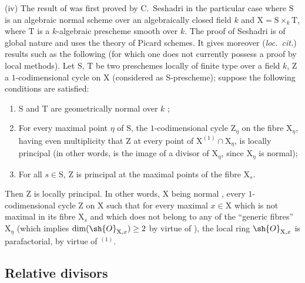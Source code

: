 \begin{env}[21.14.4bis]
\label{IV.21.14.4bis}
(iv) The result of  was first proved by C.~Seshadri \cite{IV-44} in the particular case where $\mathrm{S}$ is an algebraic normal scheme over an algebraically closed field $k$ and $\mathrm{X}=\mathrm{S}\times_k\mathrm{T}$, where $\mathrm{T}$ is a $k$-algebraic prescheme smooth over $k$.
The proof of Seshadri \cite[pp.~188--189]{IV-44} is of global nature and uses the theory of Picard schemes.
It gives moreover (\emph{loc.\ cit.}) results such as the following (for which one does not currently possess a proof by local methods).
Let $\mathrm{S}$, $\mathrm{T}$ be two preschemes locally of finite type over a field $k$, $\mathrm{Z}$ a $1$-codimensional cycle on $\mathrm{X}$ (considered as S-prescheme); suppose the following conditions are satisfied:
\begin{enumerate}[label=\arabic*\textsuperscript{o}]
  \item $\mathrm{S}$ and $\mathrm{T}$ are geometrically normal over $k$ ;
  \item For every maximal point $\eta$ of $\mathrm{S}$, the $1$-codimensional cycle $\mathrm{Z}_\eta$ on the fibre $\mathrm{X}_\eta$, having even multiplicity that $\mathrm{Z}$ at every point of $\mathrm{X}^{(1)}\cap\mathrm{X}_\eta$, is locally principal (in other words, is the image of a divisor of $\mathrm{X}_\eta$, since $\mathrm{X}_\eta$ is normal);
  \item For all $s\in\mathrm{S}$, $\mathrm{Z}$ is principal at the maximal points of the fibre $\mathrm{X}_s$.
\end{enumerate}
Then $\mathrm{Z}$ is locally principal.
In other words, $\mathrm{X}$ being normal , every $1$-codimensional cycle $\mathrm{Z}$ on $\mathrm{X}$ such that for every maximal $x\in\mathrm{X}$ which is not maximal in its fibre $\mathrm{X}_s$ and which does not belong to any of the ``generic fibres'' $\mathrm{X}_\eta$ (which implies $\dim(\sh{O}_{\mathrm{X},x})\geq 2$ by virtue of ), the local ring $\sh{O}_{\mathrm{X},x}$ is parafactorial, by virtue of  ${}^{(1)}$.
\end{env}

\subsection{Relative divisors}
\label{subsection:IV.21.15}

